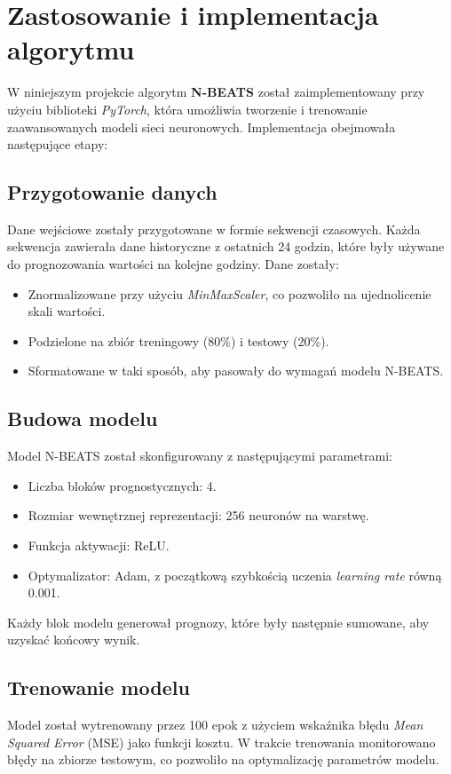 \documentclass[a4paper,fleqn,final]{cas-dc}\usepackage[authoryear,longnamesfirst]{natbib}
\begin{document}
\section{Zastosowanie i implementacja algorytmu}
W niniejszym projekcie algorytm \textbf{N-BEATS} został zaimplementowany przy użyciu biblioteki \textit{PyTorch}, która umożliwia tworzenie i trenowanie zaawansowanych modeli sieci neuronowych. Implementacja obejmowała następujące etapy:

\subsection{Przygotowanie danych}
Dane wejściowe zostały przygotowane w formie sekwencji czasowych. Każda sekwencja zawierała dane historyczne z ostatnich 24 godzin, które były używane do prognozowania wartości na kolejne godziny. Dane zostały:
\begin{itemize}
    \item Znormalizowane przy użyciu \textit{MinMaxScaler}, co pozwoliło na ujednolicenie skali wartości.
    \item Podzielone na zbiór treningowy (80\%) i testowy (20\%).
    \item Sformatowane w taki sposób, aby pasowały do wymagań modelu N-BEATS.
\end{itemize}

\subsection{Budowa modelu}
Model N-BEATS został skonfigurowany z następującymi parametrami:
\begin{itemize}
    \item Liczba bloków prognostycznych: 4.
    \item Rozmiar wewnętrznej reprezentacji: 256 neuronów na warstwę.
    \item Funkcja aktywacji: ReLU.
    \item Optymalizator: Adam, z początkową szybkością uczenia \textit{learning rate} równą 0.001.
\end{itemize}
Każdy blok modelu generował prognozy, które były następnie sumowane, aby uzyskać końcowy wynik.

\subsection{Trenowanie modelu}
Model został wytrenowany przez 100 epok z użyciem wskaźnika błędu \textit{Mean Squared Error} (MSE) jako funkcji kosztu. W trakcie trenowania monitorowano błędy na zbiorze testowym, co pozwoliło na optymalizację parametrów modelu.
\end{document}
